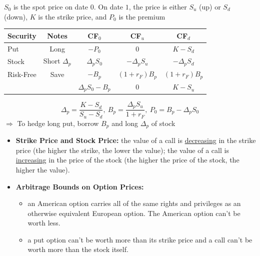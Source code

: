 \documentclass{beamer}
\begin{document}
\begin{frame}{}
	$S_{0}$ is the spot price on date $0$. On date $1$, the price is either $S_{u}$ (up) or $S_{d}$ (down), $K$ is the strike price, and $P_{0}$ is the premium
    \begin{center}
        \begin{tabular}{lcccc}
			Security & Notes & CF$_{0}$ & CF$_{u}$ & CF$_{d}$ \\ \hline\hline
			Put & Long & $-P_{0}$ & $0$ &$K-S_{d}$\\ \hline\hline
			Stock & Short $\Delta_{p}$ & $\Delta_{p} S_{0}$ & $-\Delta_{p} S_{u}$ & $-\Delta_{p} S_{d}$ \\
			Risk-Free & Save & $-B_{p}$ & $(1+r_{F})B_{p}$ & $(1+r_{F})B_{p}$\\ \hline
			& & $\Delta_{p} S_{0}-B_{p}$ & $0$ & $K-S_{u}$ \\ \hline\hline
        \end{tabular}
    \end{center}
	\begin{equation}
		\boxed{\Delta_{p}=\frac{K-S_{d}}{S_{u}-S_{d}},\:B_{p}=\frac{\Delta_{p}S_{u}}{1+r_{F}},\:P_{0}=B_{p}-\Delta_{p}S_{0}}
	\end{equation}
	$\Rightarrow$ To hedge long put, borrow $B_{p}$ and long $\Delta_{p}$ of stock 
\end{frame}

\begin{frame}{}
	
\end{frame}

\begin{frame}{}
	\begin{itemize}
		\item \textbf{Strike Price and Stock Price:} the value of a call is \underline{decreasing} in the strike price (the higher the strike, the lower the value); the value of a call is \underline{increasing} in the price of the stock (the higher the price of the stock, the higher the value). 
		\item \textbf{Arbitrage Bounds on Option Prices:} 
		\begin{itemize}
			\item an American option carries all of the same rights and privileges as an otherwise equivalent European option. The American option can't be worth less. 
			\item a put option can't be worth more than its strike price and a call can't be worth more than the stock itself.
		\end{itemize}
	\end{itemize}
\end{frame}
\end{document}
